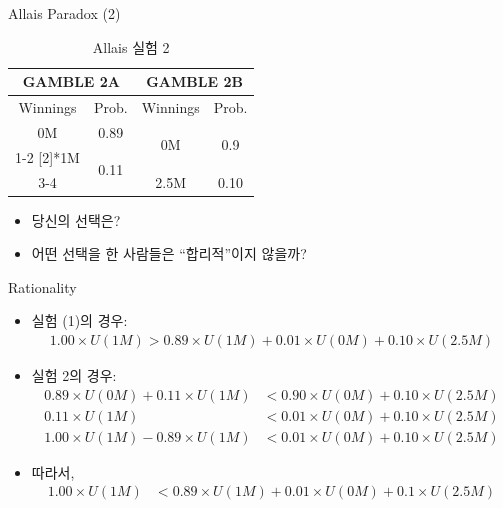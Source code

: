 \documentclass[final]{beamer}
\begin{document}
\begin{frame}[t]{Allais Paradox (2)}
	\begin{table}
	\setlength{\tabcolsep}{1.2em}
	\begin{tabular}{|c|c||c|c|} \hline
	\multicolumn{2}{|c||}{GAMBLE 2A}&\multicolumn{2}{c|}{GAMBLE 2B} \\ \hline
	Winnings & Prob. & Winnings & Prob. \\ \hline
	0M & 0.89 & \multirow{2}[2]{*}{0M} & \multirow{2}[2]{*}{0.9} \\ \cline{1-2}
	\multirow{2}[2]{*}{1M} & \multirow{2}[2]{*}{0.11} & & \\  \cline{3-4}
	& & 2.5M & 0.10 \\ \hline
	\end{tabular}
	\caption{Allais 실험 2}\label{tab:02}
	\end{table}
	\begin{itemize}
		\item 당신의 선택은?
		\item 어떤 선택을 한 사람들은 ``합리적''이지 않을까?
	\end{itemize}
\end{frame}

\begin{frame}[t]{Rationality}
	\begin{itemize}
		\item 실험 (1)의 경우:
		{\small 
		\begin{align*}
		1.00 \times U(1M) > 0.89 \times U(1M) + 0.01 \times U(0M)  + 0.10 \times U(2.5M) 
		\end{align*}
		}
		\item 실험 2의 경우:
		{\small 
		\begin{align*}
		0.89 \times U(0M) + 0.11 \times U(1M) & < 0.90 \times U(0M)  + 0.10 \times U(2.5M) \\
		0.11 \times U(1M)  & < 0.01 \times U(0M) + 0.10 \times U(2.5M) \\
		1.00 \times U(1M) - 0.89 \times U(1M) & < 0.01 \times U(0M) + 0.10 \times U(2.5M) 
		\end{align*}
		}
		\item 따라서, 
		{\small
		\begin{align*}
		1.00 \times U(1M) &< 0.89 \times U(1M) + 0.01 \times U(0M) + 0.1 \times U(2.5M) 
		\end{align*}
		}
	\end{itemize}
\end{frame}
\end{document}
